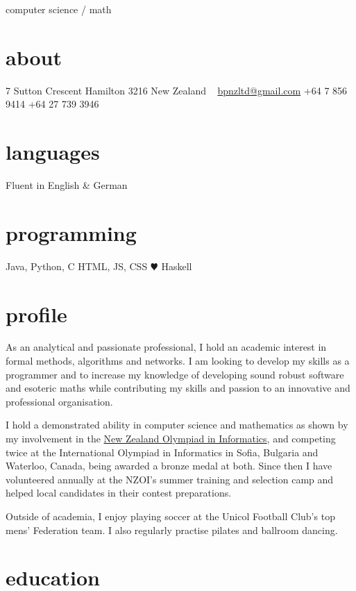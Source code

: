 \documentclass[11pt]{boris-cv}
\begin{document}
       {computer science / math}

\begin{aside}
  \section{about}
    7 Sutton Crescent
    Hamilton 3216
    New Zealand
    ~
    \href{mailto:bpnzltd@gmail.com}{bpnzltd@gmail.com}
    +64 7 856 9414
    +64 27 739 3946
  \section{languages}
    Fluent in 
    English \& German
  \section{programming}
    Java, Python, C
    HTML, JS, CSS
    {\color{red} $\varheartsuit$} Haskell
\end{aside}

\section{profile}

As an analytical and passionate professional, I hold an academic interest in
formal methods, algorithms and networks. I am looking to develop my skills as
a programmer and to increase my knowledge of developing sound robust software
and esoteric maths while contributing my skills and passion to an innovative
and professional organisation.

I hold a demonstrated ability in computer science and mathematics as shown by
my involvement in the \href{http://www.nzoi.org.nz/} {New Zealand Olympiad in
Informatics}, and competing twice at the International Olympiad in
Informatics in Sofia, Bulgaria and Waterloo, Canada, being awarded a bronze
medal at both. Since then I have volunteered annually at the NZOI's summer
training and selection camp and helped local candidates in their contest
preparations.

Outside of academia, I enjoy playing soccer at the Unicol Football Club's top
mens' Federation team. I also regularly practise pilates and ballroom
dancing.
\\
\section{education}
\end{document}
